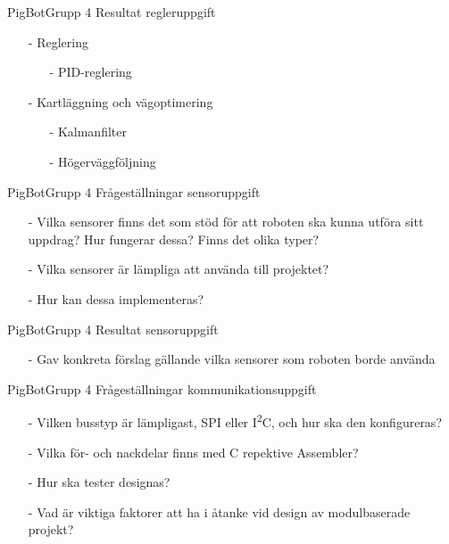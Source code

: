
\begin{frame}[fragile]{PigBot}{Grupp 4}
Resultat regleruppgift
\pause
  \begin{itemize}
    \item[-] Reglering
\begin{itemize}
	\item [-] PID-reglering
\end{itemize}

    \item[-] Kartläggning och vägoptimering
\begin{itemize}
	\item [-] Kalmanfilter
	\item [-] Högerväggföljning
\end{itemize}
  \end{itemize}
\end{frame}


\begin{frame}[fragile]{PigBot}{Grupp 4}
Frågeställningar sensoruppgift
\pause
  \begin{itemize}
    \item[-] Vilka sensorer finns det som stöd för att roboten ska kunna utföra sitt uppdrag? Hur fungerar dessa? Finns det olika typer?
    \item[-] Vilka sensorer är lämpliga att använda till projektet?
    \item[-] Hur kan dessa implementeras?
  \end{itemize}
\end{frame}


\begin{frame}[fragile]{PigBot}{Grupp 4}
Resultat sensoruppgift
  \begin{itemize}
\pause
    \item[-] Gav konkreta förslag gällande vilka sensorer som roboten borde använda 
  \end{itemize}
\end{frame}

\begin{frame}[fragile]{PigBot}{Grupp 4}
Frågeställningar kommunikationsuppgift
\pause
\begin{itemize}
	\item[-] Vilken busstyp är lämpligast, SPI eller I\textsuperscript{2}C, och hur ska den konfigureras?
	\item[-] Vilka för- och nackdelar finns med C repektive Assembler? 
	\item[-] Hur ska tester designas?
	\item[-] Vad är viktiga faktorer att ha i åtanke vid design av modulbaserade projekt?
\end{itemize}
\end{frame}

